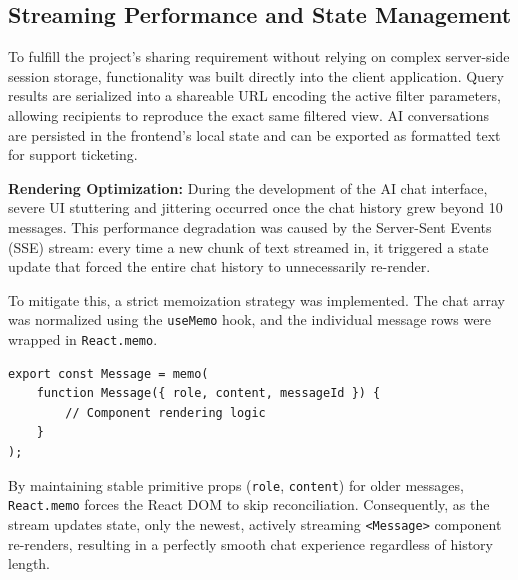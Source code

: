 \subsection{Streaming Performance and State Management}
To fulfill the project's sharing requirement without relying on complex server-side session storage, functionality was built directly into the client application. Query results are serialized into a shareable URL encoding the active filter parameters, allowing recipients to reproduce the exact same filtered view. AI conversations are persisted in the frontend's local state and can be exported as formatted text for support ticketing.

\textbf{Rendering Optimization:} During the development of the AI chat interface, severe UI stuttering and jittering occurred once the chat history grew beyond 10 messages. This performance degradation was caused by the Server-Sent Events (SSE) stream: every time a new chunk of text streamed in, it triggered a state update that forced the entire chat history to unnecessarily re-render.

To mitigate this, a strict memoization strategy was implemented. The chat array was normalized using the \texttt{useMemo} hook, and the individual message rows were wrapped in \texttt{React.memo}.

\begin{verbatim}
export const Message = memo(
    function Message({ role, content, messageId }) {
        // Component rendering logic
    }
);
\end{verbatim}

By maintaining stable primitive props (\texttt{role}, \texttt{content}) for older messages, \texttt{React.\allowbreak memo} forces the React DOM to skip reconciliation. Consequently, as the stream updates state, only the newest, actively streaming \texttt{<Message>} component re-renders, resulting in a perfectly smooth chat experience regardless of history length.

